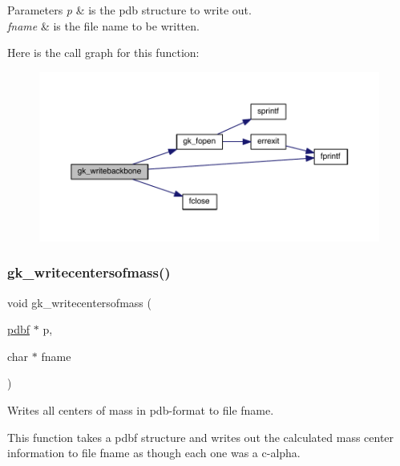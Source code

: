 \begin{DoxyParams}{Parameters}
{\em p} & is the pdb structure to write out. \\
\hline
{\em fname} & is the file name to be written. \\
\hline
\end{DoxyParams}
Here is the call graph for this function\+:\nopagebreak
\begin{figure}[H]
\begin{center}
\leavevmode
\includegraphics[width=350pt]{a00125_a04817c574e29493f0363ef81b41f82df_cgraph}
\end{center}
\end{figure}
\mbox{\label{a00125_a6be4d6cf94a1dace5677865e8958b7b3}} 
\subsubsection{\texorpdfstring{gk\+\_\+writecentersofmass()}{gk\_writecentersofmass()}}
{\footnotesize\ttfamily void gk\+\_\+writecentersofmass (\begin{DoxyParamCaption}\item[{\hyperlink{a00666}{pdbf} $\ast$}]{p,  }\item[{char $\ast$}]{fname }\end{DoxyParamCaption})}



Writes all centers of mass in pdb-\/format to file fname. 

This function takes a pdbf structure and writes out the calculated mass center information to file fname as though each one was a c-\/alpha.


